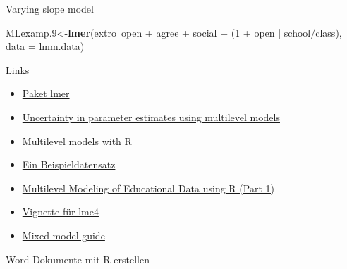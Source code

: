 \documentclass[ignorenonframetext,]{beamer}
\newenvironment{Shaded}{}{}
\newcommand{\KeywordTok}[1]{\textcolor[rgb]{0.00,0.44,0.13}{\textbf{{#1}}}}
\newcommand{\DataTypeTok}[1]{\textcolor[rgb]{0.56,0.13,0.00}{{#1}}}
\newcommand{\DecValTok}[1]{\textcolor[rgb]{0.25,0.63,0.44}{{#1}}}
\newcommand{\FloatTok}[1]{\textcolor[rgb]{0.25,0.63,0.44}{{#1}}}
\newcommand{\StringTok}[1]{\textcolor[rgb]{0.25,0.44,0.63}{{#1}}}
\newcommand{\NormalTok}[1]{{#1}}
\begin{document}
\begin{frame}[fragile]{Varying slope model}

\begin{Shaded}
\begin{Highlighting}[]
\NormalTok{MLexamp}\FloatTok{.9}\NormalTok{<-}\KeywordTok{lmer}\NormalTok{(extro~open +}\StringTok{ }\NormalTok{agree +}\StringTok{ }\NormalTok{social +}\StringTok{ }
\StringTok{                  }\NormalTok{(}\DecValTok{1} \NormalTok{+}\StringTok{ }\NormalTok{open |}\StringTok{ }\NormalTok{school/class), }
                \DataTypeTok{data =} \NormalTok{lmm.data)}
\end{Highlighting}
\end{Shaded}

\end{frame}

\begin{frame}{Links}

\begin{itemize}
\item
  \href{https://cran.r-project.org/doc/contrib/Bliese_Multilevel.pdf}{Paket
  lmer}
\item
  \href{https://www.r-bloggers.com/uncertainty-in-parameter-estimates-using-multilevel-models/}{Uncertainty
  in parameter estimates using multilevel models}
\item
  \href{https://cran.r-project.org/doc/contrib/Bliese_Multilevel.pdf}{Multilevel
  models with R}
\item
  \href{https://www.jaredknowles.com/journal/2013/11/25/getting-started-with-mixed-effect-models-in-r}{Ein
  Beispieldatensatz}
\item
  \href{https://www.r-bloggers.com/multilevel-modeling-of-educational-data-using-r-part-1/}{Multilevel
  Modeling of Educational Data using R (Part 1)}
\item
  \href{https://cran.r-project.org/web/packages/lme4/vignettes/lmer.pdf}{Vignette
  für lme4}
\item
  \href{http://ase.tufts.edu/gsc/gradresources/guidetomixedmodelsinr/mixed\%20model\%20guide.html}{Mixed
  model guide}
\end{itemize}

\end{frame}

\begin{frame}{Word Dokumente mit R erstellen}

\end{frame}
\end{document}
